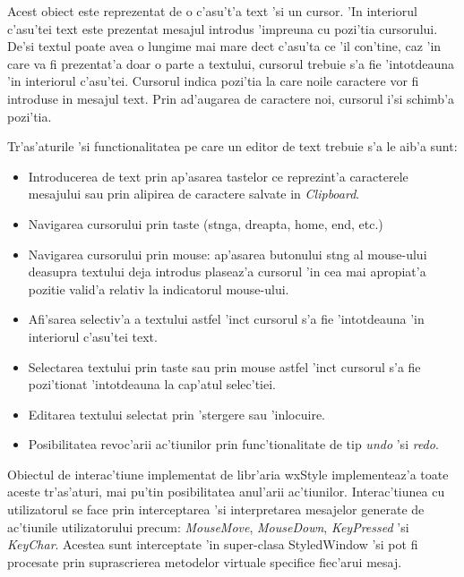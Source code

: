 \medskip

Acest obiect este reprezentat de o c'asu't'a text 'si un cursor. 'In interiorul c'asu'tei text este prezentat mesajul introdus 'impreuna cu pozi'tia cursorului. De'si textul poate avea o lungime mai mare dec{\ia}t c'asu'ta ce 'il con'tine, caz 'in care va fi prezentat'a doar o parte a textului, cursorul trebuie s'a fie 'intotdeauna 'in interiorul c'asu'tei. Cursorul indica pozi'tia la care noile caractere vor fi introduse in mesajul text. Prin ad'augarea de caractere noi, cursorul i'si schimb'a pozi'tia.

\medskip

Tr'as'aturile 'si functionalitatea pe care un editor de text trebuie s'a le aib'a sunt:

\begin{itemize}
\item Introducerea de text prin ap'asarea tastelor ce reprezint'a caracterele mesajului sau prin alipirea de caractere salvate in \emph{Clipboard}.
\item Navigarea cursorului prin taste (st{\ia}nga, dreapta, home, end, etc.)
\item Navigarea cursorului prin mouse: ap'asarea butonului st{\ia}ng al mouse-ului deasupra textului deja introdus plaseaz'a cursorul 'in cea mai apropiat'a pozitie valid'a relativ la indicatorul mouse-ului.
\item Afi'sarea selectiv'a a textului astfel 'inc{\ia}t cursorul s'a fie 'intotdeauna 'in interiorul c'asu'tei text.
\item Selectarea textului prin taste sau prin mouse astfel 'inc{\ia}t cursorul s'a fie pozi'tionat 'intotdeauna la cap'atul selec'tiei.
\item Editarea textului selectat prin 'stergere sau 'inlocuire.
\item Posibilitatea revoc'arii ac'tiunilor prin func'tionalitate de tip \emph{undo} 'si \emph{redo}.
\end{itemize}

\medskip

Obiectul de interac'tiune implementat de libr'aria wxStyle implementeaz'a toate aceste tr'as'aturi, mai pu'tin posibilitatea anul'arii ac'tiunilor. Interac'tiunea cu utilizatorul se face prin interceptarea 'si interpretarea mesajelor generate de ac'tiunile utilizatorului precum: \emph{MouseMove}, \emph{MouseDown}, \emph{KeyPressed} 'si \emph{KeyChar}. Acestea sunt interceptate 'in super-clasa StyledWindow 'si pot fi procesate prin suprascrierea metodelor virtuale specifice fiec'arui mesaj.

